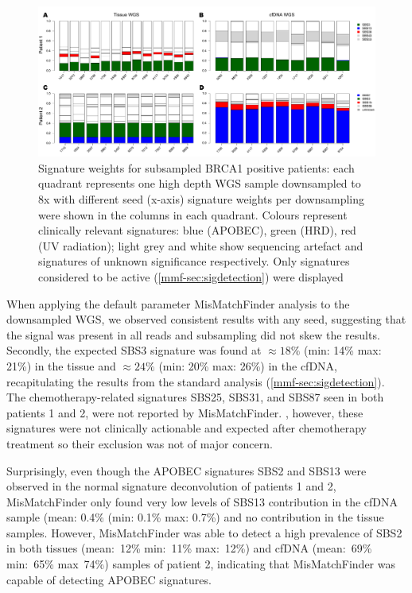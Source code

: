 \begin{figure}[hb]
\centering
\includegraphics[width=.99\linewidth]{Figures/MisMatchFinder/brca1BarPlots.pdf}
\caption[Signature weights for subsampled BRCA1 positive patients]{Signature weights for subsampled BRCA1 positive patients: each quadrant represents one high depth WGS sample downsampled to 8x with different seed (x-axis) signature weights per downsampling were shown in the columns in each quadrant. Colours represent clinically relevant signatures: blue (APOBEC), green (HRD), red (UV radiation); light grey and white show sequencing artefact and signatures of unknown significance respectively. Only signatures considered to be active (\autoref{mmf-sec:sigdetection}) were displayed}\label{fig:mmf-mbcbBarPlot}
\end{figure}

When applying the default parameter MisMatchFinder analysis to the downsampled WGS, we observed consistent results with any seed, suggesting that the signal was present in all reads and subsampling did not skew the results. Secondly, the expected SBS3 signature was found at $\approx 18\%$ (min: 14\% max: 21\%) in the tissue and $\approx 24\%$ (min: 20\% max: 26\%) in the cfDNA, recapitulating the results from the standard analysis (\autoref{mmf-sec:sigdetection}). The chemotherapy-related signatures SBS25, SBS31, and SBS87 seen in both patients 1 and  2, were not reported by MisMatchFinder. , however, these signatures were not clinically actionable and expected after chemotherapy treatment so their exclusion was not of major concern.

Surprisingly, even though the APOBEC signatures SBS2 and SBS13 were observed in the normal signature deconvolution of patients 1 and 2, MisMatchFinder only found very low levels of SBS13 contribution in the cfDNA sample (mean: 0.4\% (min: 0.1\% max: 0.7\%) and no contribution in the tissue samples. However, MisMatchFinder was able to detect a high prevalence of SBS2 in both tissues (mean:~12\% min:~11\% max:~12\%) and cfDNA (mean:~69\% min:~65\% max~74\%) samples of patient 2, indicating that MisMatchFinder was capable of detecting APOBEC signatures. 

